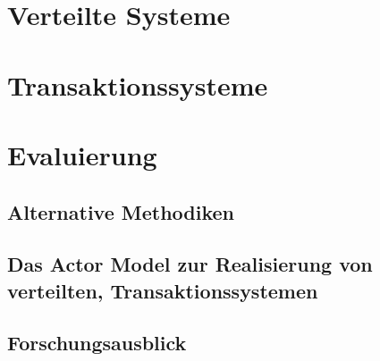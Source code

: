 
\chapter{Verteilte Systeme}
\chapter{Transaktionssysteme}
\chapter{Evaluierung}
\section{Alternative Methodiken}
\section{Das Actor Model zur Realisierung von verteilten, Transaktionssystemen} 
\section{Forschungsausblick}
